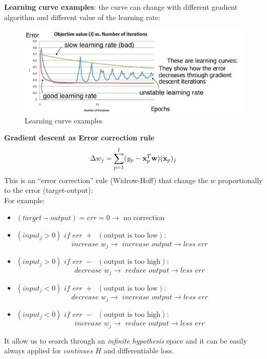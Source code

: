 \documentclass[../main.tex]{subfiles}
\begin{document}
\noindent \textbf{Learning curve examples}: the curve can change with different gradient algorithm and different value of the learning rate:
\begin{figure}[H]
    \centering
    \includegraphics[scale = 0.4]{lectures/2_linear_model/2_learning_curve.png}
    \caption{Learning curve examples}
    \label{fig:2_learning_curve}
\end{figure}
\noindent \textbf{Gradient descent as
Error correction rule}\\
$$\Delta w_j = \sum_{p = 1}^{l} (y_p - \bold{x}_p^T\bold{w})(\bold{x}_p)_j$$
This is an “error correction” rule (Widrow-Hoff) that change the $w$ proportionally to the error (target-output):\\
For example:
\begin{itemize}
    \item $(target - output) = err=0 \rightarrow$ no correction
    
    \item $(input_j>0)\,\, if\,\,err\,\,+ \;\; (\text{output is too low}):$
    $$increase\,\, w_j \rightarrow\,\, increase\,\, output \rightarrow less\,\, err$$
    
    \item $(input_j>0)\,\, if\,\,err\,\,-\;\;(\text{output is too high}): $
    $$decrease\,\, w_j \rightarrow\,\, reduce\,\, output \rightarrow less\,\, err$$

    \item $(input_j<0)\,\, if\,\,err\,\,+\;\;(\text{output is too low}): $
    $$decrease\,\, w_j \rightarrow\,\, increase\,\, output \rightarrow less\,\, err$$  

    \item $(input_j<0)\,\, if\,\,err\,\,- \;\; (\text{output is too high}):$
    $$increase\,\, w_j \rightarrow\,\, reduce\,\, output \rightarrow less\,\, err$$
    

    

   
\end{itemize}
It allow us to search through an \emph{infinite hypothesis} space and it can be easily always applied for \emph{continues $H$} and differentiable loss.\\
\end{document}
